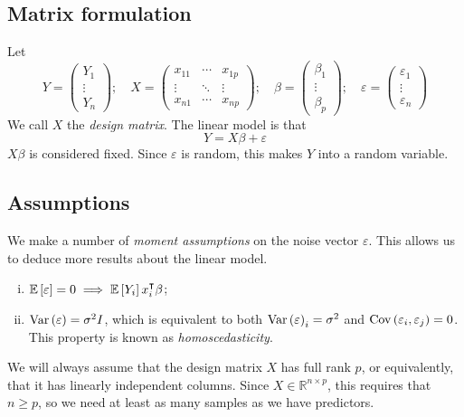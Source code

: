 \subsection{Matrix formulation}
Let
\[ Y = \begin{pmatrix}
	Y_1 \\
	\vdots \\
	Y_n
\end{pmatrix};\quad X = \begin{pmatrix}
	x_{11} & \cdots & x_{1p} \\
	\vdots & \ddots & \vdots \\
	x_{n1} & \cdots & x_{np}
\end{pmatrix};\quad \beta = \begin{pmatrix}
	\beta_1 \\
	\vdots \\
	\beta_p
\end{pmatrix};\quad \varepsilon = \begin{pmatrix}
	\varepsilon_1 \\
	\vdots \\
	\varepsilon_n
\end{pmatrix} \]
We call \( X \) the \textit{design matrix}.
The linear model is that
\[ Y = X\beta + \varepsilon \]
\( X\beta \) is considered fixed.
Since \( \varepsilon \) is random, this makes \( Y \) into a random variable.

\subsection{Assumptions}
We make a number of \textit{moment assumptions} on the noise vector \( \varepsilon \).
This allows us to deduce more results about the linear model.
\begin{enumerate}[(i)]
	\item \( \mathbb{E}\left[{\varepsilon}\right] = 0 \implies \mathbb{E}\left[{Y_i}\right] x_i^\intercal \beta \);
	\item \( \operatorname{Var}\left({\varepsilon}\right) = \sigma^2 I \), which is equivalent to both \( \operatorname{Var}\left({\varepsilon}\right)_i = \sigma^2 \) and \( \operatorname{Cov}\left({\varepsilon_i, \varepsilon_j}\right) = 0 \). This property is known as \textit{homoscedasticity}.
\end{enumerate}
We will always assume that the design matrix \( X \) has full rank \( p \), or equivalently, that it has linearly independent columns.
Since \( X \in \mathbb R^{n \times p} \), this requires that \( n \geq p \), so we need at least as many samples as we have predictors.

